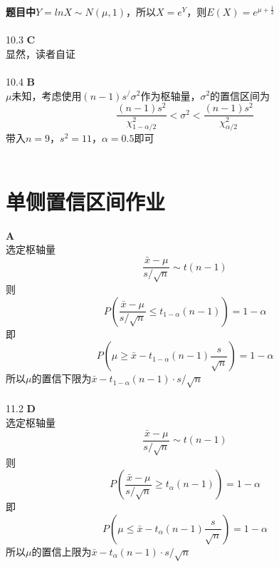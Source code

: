 \documentclass[a4paper]{ctexart}    %
\begin{document}
	\textbf{题目中}$ Y = lnX \sim N(\mu, 1) $，所以$ X = e^{Y} $，则$ E(X) = e^{\mu + \frac{1}{2}} $
	\\ \\
	10.3 \quad \textbf{C} \\
	显然，读者自证 \\ \\
	10.4 \quad \textbf{B} \\
	$ \mu $未知，考虑使用$ (n-1)s^/\sigma^2 $作为枢轴量，$\sigma^2$的置信区间为
	\begin{equation*}
		\frac{(n-1)s^2}{\chi_{1-\alpha/2}^{2}}< \sigma^2 < \frac{(n-1)s^2}{\chi_{\alpha/2}^{2}}
	\end{equation*}
	带入$ n = 9 $，$ s^2 = 11 $，$ \alpha = 0.5 $即可 \\
	\\
	\section{单侧置信区间作业}
	 \quad \textbf{A} \\
	选定枢轴量
	\begin{equation*}
		\frac{\bar{x} - \mu}{s / \sqrt{n}} \sim t(n - 1)
	\end{equation*}
	则
	\begin{equation*}
		P\left( \frac{\bar{x} - \mu}{s / \sqrt{n}} \leq  t_{1 - \alpha}(n - 1)\right) = 1 - \alpha
	\end{equation*}
	即
	\begin{equation*}
		P\left(\mu \geq \bar{x} - t_{1 - \alpha}(n - 1) \frac{s}{\sqrt{n}}\right) = 1 - \alpha
	\end{equation*}
	所以$ \mu $的置信下限为$ \bar{x} - t_{1 - \alpha}(n - 1) \cdot s / \sqrt{n} $ \\ \\
	11.2 \quad \textbf{D} \\
	选定枢轴量
	\begin{equation*}
		\frac{\bar{x} - \mu}{s / \sqrt{n}} \sim t(n - 1)
	\end{equation*}
	则
	\begin{equation*}
		P\left( \frac{\bar{x} - \mu}{s / \sqrt{n}} \geq  t_{\alpha}(n - 1)\right) = 1 - \alpha
	\end{equation*}
	即
	\begin{equation*}
		P\left(\mu \leq \bar{x} - t_{\alpha}(n - 1) \frac{s}{\sqrt{n}}\right) = 1 - \alpha
	\end{equation*}
	所以$ \mu $的置信上限为$ \bar{x} - t_{\alpha}(n - 1) \cdot s / \sqrt{n} $ \\ \\
\end{document}
